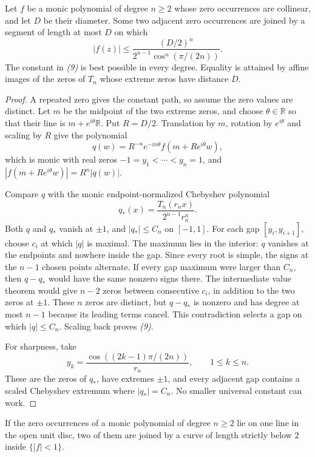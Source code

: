\begin{theorem}
\label{thm:sharp-collinear-diameter}
Let $f$ be a monic polynomial of degree $n\ge2$ whose zero occurrences are
collinear, and let $D$ be their diameter.  Some two adjacent zero occurrences
are joined by a segment of length at most $D$ on which
\[
 |f(z)|\le
 \frac{(D/2)^n}{2^{n-1}\cos^n(\pi/(2n))}.          \tag{9}
\]
The constant in \emph{(9)} is best possible in every degree.  Equality is
attained by affine images of the zeros of $T_n$ whose extreme zeros have
distance $D$.
\end{theorem}

\begin{proof}
A repeated zero gives the constant path, so assume the zero values are
distinct. Let $m$ be the midpoint of the two extreme zeros, and choose
$\theta\in\mathbb R$ so that their line is $m+e^{i\theta}\mathbb R$.
Put $R=D/2$. Translation by $m$, rotation by $e^{i\theta}$ and scaling
by $R$ give the polynomial
\[
 q(w)=R^{-n}e^{-in\theta}f(m+Re^{i\theta}w),
\]
which is monic with real zeros
$-1=y_1<\cdots<y_n=1$, and
$|f(m+Re^{i\theta}w)|=R^n|q(w)|$.

Compare $q$ with the monic endpoint-normalized Chebyshev polynomial
\[
 q_*(x)=\frac{T_n(r_nx)}{2^{n-1}r_n^n}.
\]
Both $q$ and $q_*$ vanish at $\pm1$, and $|q_*|\le C_n$ on
$[-1,1]$.  For each gap $[y_i,y_{i+1}]$, choose $c_i$ at which
$|q|$ is maximal. The maximum lies in the interior: $q$ vanishes at the
endpoints and nowhere inside the gap. Since every root is simple, the
signs at the $n-1$ chosen points alternate. If every gap maximum were
larger than $C_n$, then $q-q_*$ would have the same nonzero signs there.
The intermediate value theorem would give $n-2$ zeros between consecutive
$c_i$, in addition to the two zeros at $\pm1$. These $n$ zeros are distinct,
but $q-q_*$ is nonzero and has degree at most $n-1$ because its leading
terms cancel.
This contradiction selects a gap on which $|q|\le C_n$.  Scaling back proves
\emph{(9)}.

For sharpness, take
\[
 y_k=\frac{\cos((2k-1)\pi/(2n))}{r_n},
 \qquad 1\le k\le n.
\]
These are the zeros of $q_*$, have extremes $\pm1$, and every adjacent gap
contains a scaled Chebyshev extremum where $|q_*|=C_n$.  No smaller universal
constant can work.
\end{proof}

\begin{corollary}
\label{cor:collinear-erdos-1041}
If the zero occurrences of a monic polynomial of degree $n\ge2$ lie on one line
in the open unit disc, two of them are joined by a curve of length strictly
below $2$ inside $\{|f|<1\}$.
\end{corollary}

